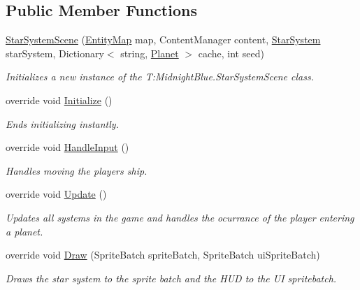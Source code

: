 \subsection*{Public Member Functions}
\begin{DoxyCompactItemize}
\item 
\hyperlink{class_midnight_blue_1_1_star_system_scene_a630b2de039b719d35fbdf572bbc69ea0}{Star\+System\+Scene} (\hyperlink{class_midnight_blue_1_1_engine_1_1_entity_component_1_1_entity_map}{Entity\+Map} map, Content\+Manager content, \hyperlink{class_midnight_blue_1_1_star_system}{Star\+System} star\+System, Dictionary$<$ string, \hyperlink{class_midnight_blue_1_1_planet}{Planet} $>$ cache, int seed)
\begin{DoxyCompactList}\small\item\em Initializes a new instance of the T\+:\+Midnight\+Blue.\+Star\+System\+Scene class. \end{DoxyCompactList}\item 
override void \hyperlink{class_midnight_blue_1_1_star_system_scene_a1b593cd45d0f1b6c02f17ec5dd1033ca}{Initialize} ()
\begin{DoxyCompactList}\small\item\em Ends initializing instantly. \end{DoxyCompactList}\item 
override void \hyperlink{class_midnight_blue_1_1_star_system_scene_a9fd64901322082a4da8658650257163d}{Handle\+Input} ()
\begin{DoxyCompactList}\small\item\em Handles moving the players ship. \end{DoxyCompactList}\item 
override void \hyperlink{class_midnight_blue_1_1_star_system_scene_ac36506b721064e015a9f93140681d93a}{Update} ()
\begin{DoxyCompactList}\small\item\em Updates all systems in the game and handles the ocurrance of the player entering a planet. \end{DoxyCompactList}\item 
override void \hyperlink{class_midnight_blue_1_1_star_system_scene_ac3d90fb8d914d15b912f5da3cc1aa8a0}{Draw} (Sprite\+Batch sprite\+Batch, Sprite\+Batch ui\+Sprite\+Batch)
\begin{DoxyCompactList}\small\item\em Draws the star system to the sprite batch and the H\+UD to the UI spritebatch. \end{DoxyCompactList}\item 

\end{DoxyCompactItemize}
